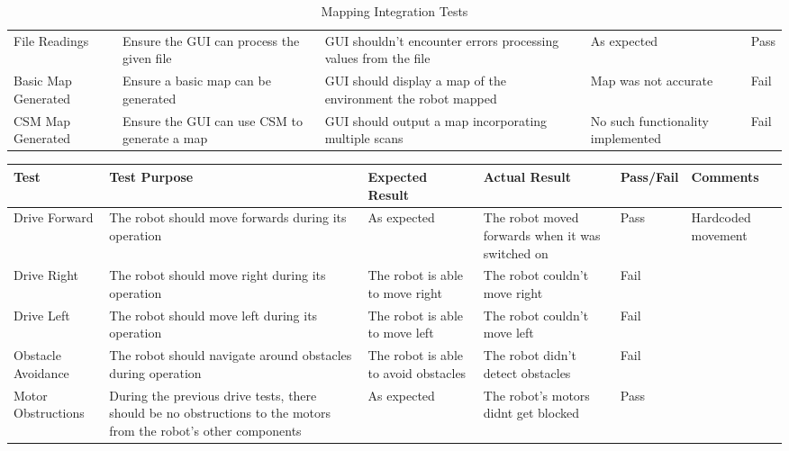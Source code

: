 \begin{appendices}
\begin{landscape}
\begin{table}[h!]
\begin{tabular}{| p{2.5cm} | p{5cm} | p{4cm} | p{3cm} | p{1.5cm} |}
							File Readings & Ensure the GUI can process the given file & GUI shouldn't encounter errors processing values from the file & As expected & Pass \\
							
							Basic Map Generated & Ensure a basic map can be generated  & GUI should display a map of the environment the robot mapped & Map was not accurate & Fail \\ 
							
							CSM Map Generated & Ensure the GUI can use CSM to generate a map  & GUI should output a map incorporating multiple scans & No such functionality implemented & Fail \\ [1ex] 
							\hline
						\end{tabular}
						\caption{Mapping Integration Tests}
						\label{table:mappingtests}		
					\end{table}
				
				\begin{table}[h!]
					\centering
					\begin{tabular}{| p{2.5cm} | p{5cm} | p{4cm} | p{4cm} | p{1.5cm} | p{2cm} |} 
						\hline
						Test & Test Purpose & Expected Result & Actual Result & Pass/Fail & Comments \\ [0.5ex] 
						\hline
						Drive Forward & The robot should move forwards during its operation & As expected & The robot moved forwards when it was switched on & Pass & Hardcoded movement  \\
							
						Drive Right & The robot should move right during its operation & The robot is able to move right & The robot couldn't move right & Fail &   \\
							
						Drive Left & The robot should move left during its operation & The robot is able to move left & The robot couldn't move left & Fail &   \\
						
						Obstacle Avoidance & The robot should navigate around obstacles during operation & The robot is able to avoid obstacles & The robot didn't detect obstacles & Fail &   \\
							
						Motor Obstructions & During the previous drive tests, there should be no obstructions to the motors from the robot's other components & As expected & The robot's motors didnt get blocked & Pass &   \\
							

\end{tabular}
\end{table}
\end{landscape}
\end{appendices}
